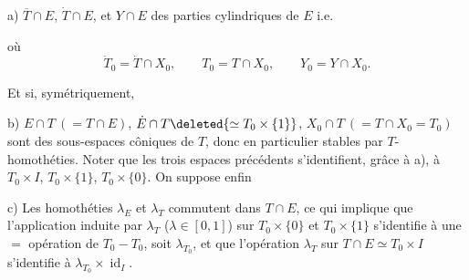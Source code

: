 
a) $\overline T\cap E$, $\dot T\cap E$, et $Y\cap E$ 
 des parties cylindriques de
$E$ i.e.



où
\[
\dot T_0=\dot T\cap X_0,\qquad
T_0=T\cap X_0,\qquad
Y_0=Y\cap X_0.
\]

Et si, symétriquement,

b) $E\cap T\ (=T\cap E)$, $\dot E\cap T\deleted{\simeq T_0\times\{1\}}$,
$X_0\cap T\ (=T\cap X_0=T_0)$ sont des
sous-espaces côniques de $T$, donc en particulier
stables par $T$-homothéties.  Noter que
les trois espaces précédents s'identifient, grâce à a),
à $T_0\times I$, $T_0\times\{1\}$, $T_0\times\{0\}$. On suppose enfin

c) Les homothéties  $\lambda_E$ et $\lambda_T$ commutent
dans $T\cap E$, ce qui implique que l'application
\deleted{$\unsure{\lambda}$} induite par $\lambda_T$ ($\lambda\in[0,1]$) sur
$T_0\times\{0\}$ et $T_0\times\{1\}$
s'identifie à une $=$  opération de
$T_0-T_0$,  soit $\lambda_{T_0}$, et que l'opération
$\lambda_T$ sur $T\cap E\simeq T_0\times I$ s'identifie à
 $\lambda_{T_0}\times\operatorname{id}_I$.

